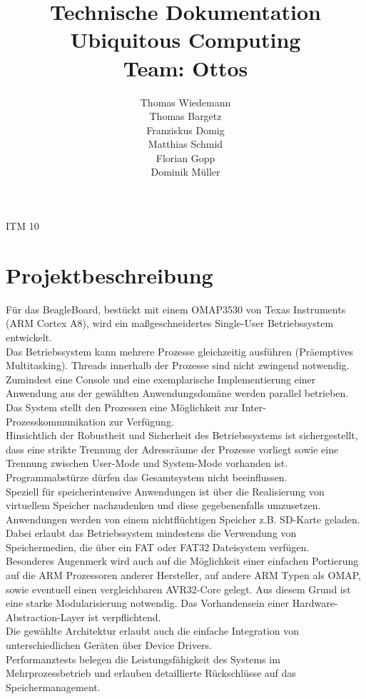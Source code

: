 \documentclass[10pt,a4paper]{article}
\begin{document}
\title{Technische Dokumentation\\\bigskip
Ubiquitous Computing\\
Team: Ottos }
\author{
Thomas Wiedemann\\ 
Thomas Bargetz\\
Franziskus Domig\\
Matthias Schmid \\
Florian Gopp\\
Dominik Müller\\ }

\maketitle
\begin{center}
ITM 10\\\bigskip


\end{center}

\newpage
\tableofcontents
\newpage
\section{Projektbeschreibung}
Für das BeagleBoard, bestückt mit einem OMAP3530 von Texas Instruments (ARM Cortex A8), wird ein maßgeschneidertes Single-User Betriebssystem entwickelt.\\
Das Betriebssystem kann mehrere Prozesse gleichzeitig ausführen (Präemptives Multitasking). Threads innerhalb der Prozesse sind nicht zwingend notwendig. Zumindest eine Console und eine exemplarische Implementierung einer Anwendung aus der gewählten Anwendungsdomäne werden parallel betrieben. Das System stellt den Prozessen eine Möglichkeit zur Inter-Prozesskommunikation zur Verfügung.\\
Hinsichtlich der Robustheit und Sicherheit des Betriebssystems ist sichergestellt, dass eine strikte Trennung der Adressräume der Prozesse vorliegt sowie eine Trennung zwischen User-Mode und System-Mode vorhanden ist. Programmabstürze dürfen das Gesamtsystem nicht beeinflussen.\\
Speziell für speicherintensive Anwendungen ist über die Realisierung von virtuellem Speicher nachzudenken und diese gegebenenfalls umzusetzen.\\
Anwendungen werden von einem nichtflüchtigen Speicher z.B. SD-Karte geladen. Dabei erlaubt das Betriebssystem mindestens die Verwendung von Speichermedien, die über ein FAT oder FAT32 Dateisystem verfügen.\\
Besonderes Augenmerk wird auch auf die Möglichkeit einer einfachen Portierung auf die ARM Prozessoren anderer Hersteller, auf andere ARM Typen als OMAP, sowie eventuell einen vergleichbaren AVR32-Core gelegt. Aus diesem Grund ist eine starke Modularisierung notwendig. Das Vorhandensein einer Hardware-Abstraction-Layer ist verpflichtend.\\
Die gewählte Architektur erlaubt auch die einfache Integration von unterschiedlichen Geräten über Device Drivers.\\
Performanztests belegen die Leistungsfähigkeit des Systems im Mehrprozessbetrieb und erlauben detaillierte Rückschlüsse auf das Speichermanagement.
\end{document}
